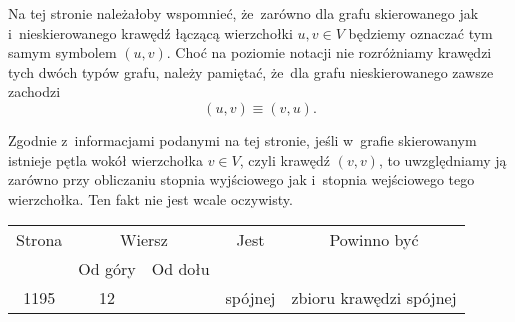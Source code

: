 \documentclass[a4paper,11pt]{article}
\begin{document}
\vspace{\spaceFour}





\noindent
{} Na tej stronie należałoby wspomnieć, że~zarówno dla grafu
skierowanego jak i~nieskierowanego krawędź łączącą wierzchołki $u, v \in V$
będziemy oznaczać tym samym symbolem $( u, v )$. Choć na poziomie notacji
nie rozróżniamy krawędzi tych dwóch typów grafu, należy pamiętać, że~dla
grafu nieskierowanego zawsze zachodzi
\begin{equation}
  \label{eq:CormenAtAl-WprowadzenieDoAlgorytmow-26}
  ( u, v ) \equiv ( v, u ).
\end{equation}

\vspace{\spaceFour}





\noindent
{} Zgodnie z~informacjami podanymi na tej stronie, jeśli w~grafie
skierowanym istnieje pętla wokół wierzchołka $v \in V$, czyli krawędź
$( v, v )$, to uwzględniamy ją zarówno przy obliczaniu stopnia wyjściowego
jak i~stopnia wejściowego tego wierzchołka. Ten fakt nie jest wcale
oczywisty.

\vspace{\spaceFour}











\newpage



\begin{center}

  \begin{tabular}{|c|c|c|c|c|}
    \hline
    Strona & \multicolumn{2}{c|}{Wiersz} & Jest
                              & Powinno być \\ \cline{2-3}
    & Od góry & Od dołu & & \\
    \hline
    1195 & 12 & & spójnej & zbioru krawędzi spójnej \\
    \hline
  \end{tabular}

\end{center}
\end{document}
